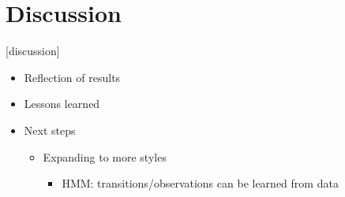 \section{Discussion}

[discussion]

\begin{itemize}
    \item Reflection of results
    \item Lessons learned
    \item Next steps
    \begin{itemize}
        \item Expanding to more styles
        \begin{itemize}
            \item HMM: transitions/observations can be learned from data
        \end{itemize}
    \end{itemize}
\end{itemize}
